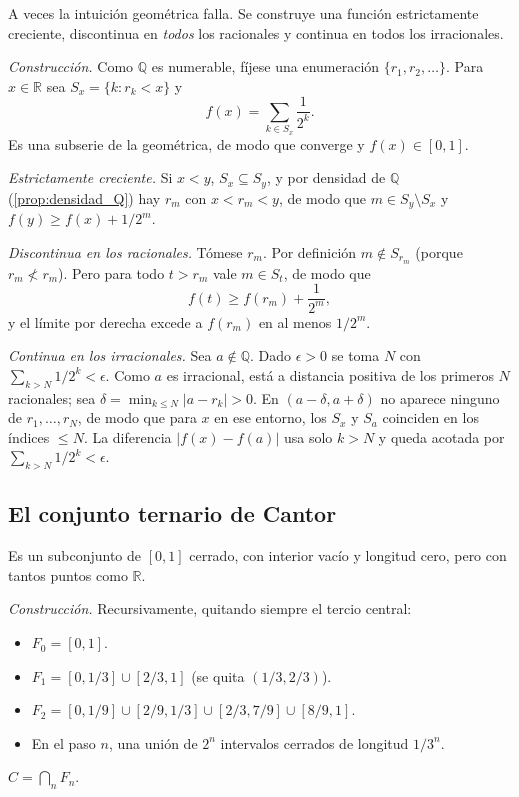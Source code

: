 \documentclass[11pt, a4paper]{article}
\begin{document}
A veces la intuición geométrica falla. Se construye una función estrictamente
creciente, discontinua en \emph{todos} los racionales y continua en todos los irracionales.

\textit{Construcción.} Como $\mathbb{Q}$ es numerable, fíjese una enumeración
$\{r_1, r_2, \dots\}$. Para $x \in \mathbb{R}$ sea $S_x = \{k : r_k < x\}$ y
$$ f(x) = \sum_{k \in S_x} \frac{1}{2^k}. $$
Es una subserie de la geométrica, de modo que converge y $f(x) \in [0, 1]$.

\textit{Estrictamente creciente.} Si $x < y$, $S_x \subseteq S_y$, y por densidad de $\mathbb{Q}$
(\ref{prop:densidad_Q}) hay $r_m$ con $x < r_m < y$, de modo que $m \in S_y \setminus S_x$ y
$f(y) \ge f(x) + 1/2^m$.

\textit{Discontinua en los racionales.} Tómese $r_m$. Por definición $m \notin S_{r_m}$ (porque
$r_m \not< r_m$). Pero para todo $t > r_m$ vale $m \in S_t$, de modo que
$$ f(t) \ge f(r_m) + \frac{1}{2^m}, $$
y el límite por derecha excede a $f(r_m)$ en al menos $1/2^m$.

\textit{Continua en los irracionales.} Sea $a \notin \mathbb{Q}$.
Dado $\epsilon > 0$ se toma $N$ con $\sum_{k > N} 1/2^k < \epsilon$.
Como $a$ es irracional, está a distancia positiva de los primeros $N$ racionales;
sea $\delta = \min_{k \le N} |a - r_k| > 0$.
En $(a - \delta, a + \delta)$ no aparece ninguno de $r_1, \dots, r_N$,
de modo que para $x$ en ese entorno, los $S_x$ y $S_a$ coinciden en los índices $\le N$.
La diferencia $|f(x) - f(a)|$ usa solo $k > N$ y queda acotada por
$\sum_{k > N} 1/2^k < \epsilon$.

\subsection{El conjunto ternario de Cantor}

Es un subconjunto de $[0, 1]$ cerrado, con interior vacío y longitud cero, pero con tantos puntos
como $\mathbb{R}$.

\textit{Construcción.} Recursivamente, quitando siempre el tercio central:
\begin{itemize}
    \item $F_0 = [0, 1]$.
    \item $F_1 = [0, 1/3] \cup [2/3, 1]$ (se quita $(1/3, 2/3)$).
    \item $F_2 = [0, 1/9] \cup [2/9, 1/3] \cup [2/3, 7/9] \cup [8/9, 1]$.
    \item En el paso $n$, una unión de $2^n$ intervalos cerrados de longitud $1/3^n$.
\end{itemize}
$C = \bigcap_n F_n$.
\end{document}
